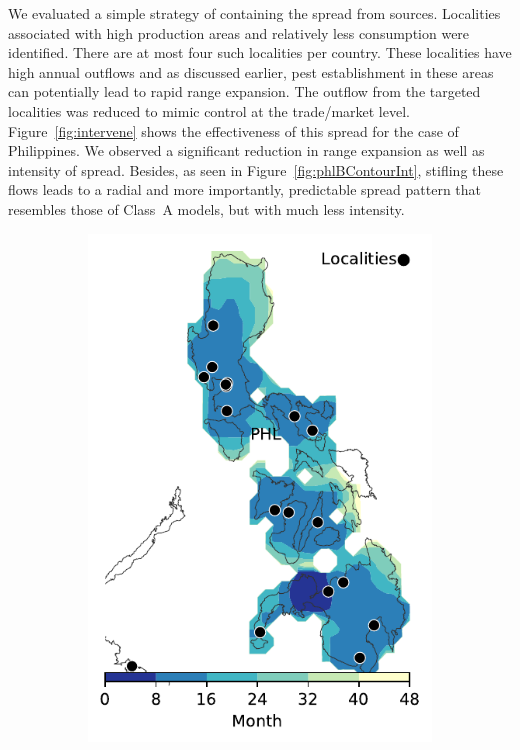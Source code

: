 \documentclass[11pt]{article}
\theoremstyle{definition}
\begin{document}
We evaluated a simple strategy of containing the spread from sources.
Localities associated with high production areas and relatively less
consumption were identified. There are at most four such localities per
country. These localities have high annual outflows and as discussed
earlier, pest establishment in these areas can potentially lead to rapid
range expansion.  The outflow from the targeted localities was reduced to
mimic control at the trade/market level. Figure~\ref{fig:intervene} shows
the effectiveness of this spread for the case of Philippines. We observed a
significant reduction in range expansion as well as intensity of spread.
Besides, as seen in Figure~\ref{fig:phlBContourInt}, stifling these flows
leads to a radial and more importantly, predictable spread pattern that
resembles those of Class~A models, but with much less intensity.
\begin{figure}[ht]
\begin{subfigure}[b]{.28\textwidth}
\includegraphics[width=\textwidth]{../cellular_automata/results/contour/PH_model-B_precip1_m1_l3.pdf}

\end{subfigure}
\end{figure}
\end{document}
